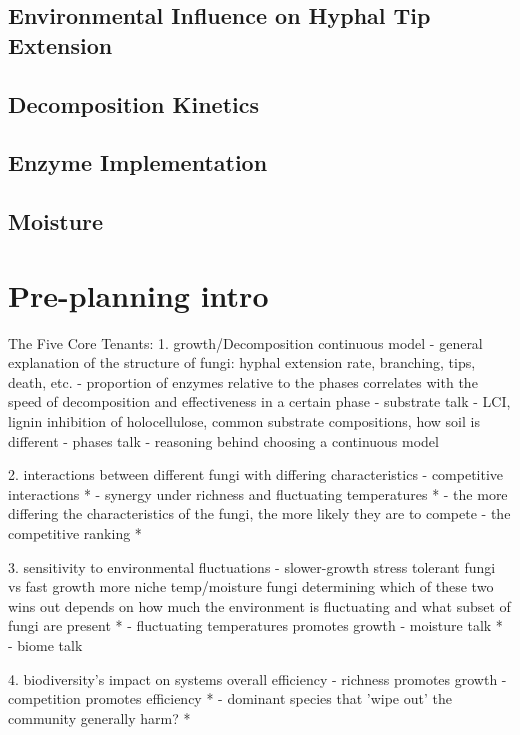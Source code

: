 \documentclass[12pt]{article}
\begin{document}
\begin{multicols}{2}

\subsection{Environmental Influence on Hyphal Tip Extension}

\subsection{Decomposition Kinetics}

\subsection{Enzyme Implementation}

\subsection{Moisture}

\section{Pre-planning intro}

The Five Core Tenants:
1. growth/Decomposition continuous model
- general explanation of the structure of fungi: hyphal extension rate, branching, tips, death, etc.
- proportion of enzymes relative to the phases correlates with the speed of decomposition and effectiveness in a certain phase
- substrate talk - LCI, lignin inhibition of holocellulose, common substrate compositions, how soil is different
- phases talk
- reasoning behind choosing a continuous model

2. interactions between different fungi with differing characteristics
- competitive interactions *
- synergy under richness and fluctuating temperatures *
- the more differing the characteristics of the fungi, the more likely they are to compete
- the competitive ranking *

3. sensitivity to environmental fluctuations
- slower-growth stress tolerant fungi vs fast growth more niche temp/moisture fungi determining which of these two wins out depends on how much the environment is fluctuating and what subset of fungi are present *
- fluctuating temperatures promotes growth
- moisture talk *
- biome talk

4. biodiversity's impact on systems overall efficiency
- richness promotes growth
- competition promotes efficiency *
- dominant species that 'wipe out' the community generally harm? *


\end{multicols}
\end{document}
